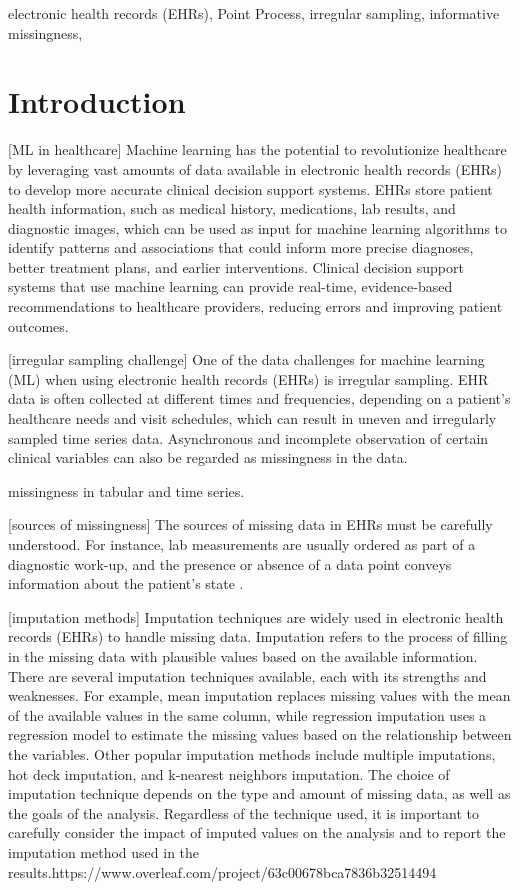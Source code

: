 \documentclass[journal,twoside,web]{ieeecolor}
\begin{document}
\begin{IEEEkeywords}
    electronic health records (EHRs), Point Process, irregular sampling, informative missingness,
\end{IEEEkeywords}


\section{Introduction}
\label{sec:intro}

[ML in healthcare] Machine learning has the potential to revolutionize healthcare by leveraging vast amounts of data available in electronic health records (EHRs) to develop more accurate clinical decision support systems. EHRs store patient health information, such as medical history, medications, lab results, and diagnostic images, which can be used as input for machine learning algorithms to identify patterns and associations that could inform more precise diagnoses, better treatment plans, and earlier interventions. Clinical decision support systems that use machine learning can provide real-time, evidence-based recommendations to healthcare providers, reducing errors and improving patient outcomes.

[irregular sampling challenge] One of the data challenges for machine learning (ML) when using electronic health records (EHRs) is irregular sampling. EHR data is often collected at different times and frequencies, depending on a patient's healthcare needs and visit schedules, which can result in uneven and irregularly sampled time series data. Asynchronous and incomplete observation of certain clinical variables can also be regarded as missingness in the data.

missingness in tabular and time series.

[sources of missingness] The sources of missing data in EHRs must be carefully understood. For instance, lab measurements are usually ordered as part of a diagnostic work-up, and the presence or absence of a data point conveys information about the patient's state \cite*{ghassemiReviewChallengesOpportunities2020}.

[imputation methods] Imputation techniques are widely used in electronic health records (EHRs) to handle missing data. Imputation refers to the process of filling in the missing data with plausible values based on the available information. There are several imputation techniques available, each with its strengths and weaknesses. For example, mean imputation replaces missing values with the mean of the available values in the same column, while regression imputation uses a regression model to estimate the missing values based on the relationship between the variables. Other popular imputation methods include multiple imputations, hot deck imputation, and k-nearest neighbors imputation. The choice of imputation technique depends on the type and amount of missing data, as well as the goals of the analysis. Regardless of the technique used, it is important to carefully consider the impact of imputed values on the analysis and to report the imputation method used in the results.https://www.overleaf.com/project/63c00678bca7836b32514494
\end{document}
